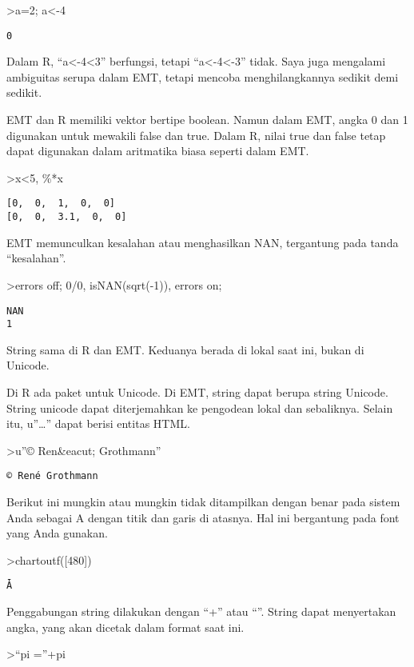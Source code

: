 \documentclass[
]{book}
\begin{document}
\textgreater a=2; a\textless-4

\begin{verbatim}
0
\end{verbatim}

Dalam R, ``a\textless-4\textless3'' berfungsi, tetapi ``a\textless-4\textless-3'' tidak. Saya juga mengalami ambiguitas serupa dalam EMT, tetapi mencoba menghilangkannya sedikit demi sedikit.

EMT dan R memiliki vektor bertipe boolean. Namun dalam EMT, angka 0 dan 1 digunakan untuk mewakili false dan true. Dalam R, nilai true dan false tetap dapat digunakan dalam aritmatika biasa seperti dalam EMT.

\textgreater x\textless5, \%*x

\begin{verbatim}
[0,  0,  1,  0,  0]
[0,  0,  3.1,  0,  0]
\end{verbatim}

EMT memunculkan kesalahan atau menghasilkan NAN, tergantung pada tanda ``kesalahan''.

\textgreater errors off; 0/0, isNAN(sqrt(-1)), errors on;

\begin{verbatim}
NAN
1
\end{verbatim}

String sama di R dan EMT. Keduanya berada di lokal saat ini, bukan di Unicode.

Di R ada paket untuk Unicode. Di EMT, string dapat berupa string Unicode. String unicode dapat diterjemahkan ke pengodean lokal dan sebaliknya. Selain itu, u''\ldots'' dapat berisi entitas HTML.

\textgreater u''© Ren\&eacut; Grothmann''

\begin{verbatim}
© René Grothmann
\end{verbatim}

Berikut ini mungkin atau mungkin tidak ditampilkan dengan benar pada sistem Anda sebagai A dengan titik dan garis di atasnya. Hal ini bergantung pada font yang Anda gunakan.

\textgreater chartoutf({[}480{]})

\begin{verbatim}
Ǡ
\end{verbatim}

Penggabungan string dilakukan dengan ``+'' atau ``\textbar{}''. String dapat menyertakan angka, yang akan dicetak dalam format saat ini.

\textgreater{}``pi =''+pi
\end{document}
